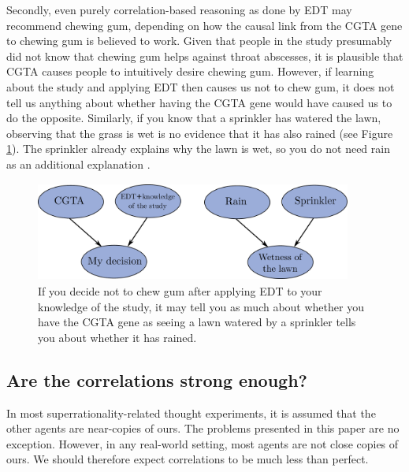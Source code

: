 Secondly, even purely correlation-based reasoning as done by EDT may
recommend chewing gum, depending on how the causal link from the CGTA
gene to chewing gum is believed to work. Given that people in the study
presumably did not know that chewing gum helps against throat abscesses,
it is plausible that CGTA causes people to intuitively desire chewing
gum. However, if learning about the study and applying EDT then causes
us not to chew gum, it does not tell us anything about whether having
the CGTA gene would have caused us to do the opposite. Similarly, if you
know that a sprinkler has watered the lawn, observing that the grass is
wet is no evidence that it has also rained (see Figure
\ref{tickle-defense}). The sprinkler already explains why the lawn is wet,
so you do not need rain as an additional explanation
\parencite{Ahmed2014-ec}.


\begin{figure}
    \centering
    \includegraphics[width=4.09792in,height=1.27975in]{figs/tickle-defense}
    \caption{If you decide not to chew gum after applying EDT
to your knowledge of the study, it may tell you as much about whether
you have the CGTA gene as seeing a lawn watered by a sprinkler tells you
about whether it has rained.}
    \label{tickle-defense}
\end{figure}

\hypertarget{are-the-correlations-strong-enough}{\subsection{Are the
correlations strong enough?}\label{are-the-correlations-strong-enough}}

In most superrationality-related thought experiments, it is assumed that the
other agents are near-copies of ours. The problems presented in this
paper are no exception. However, in any real-world setting, most agents
are not close copies of ours. We should therefore expect correlations to
be much less than perfect.

